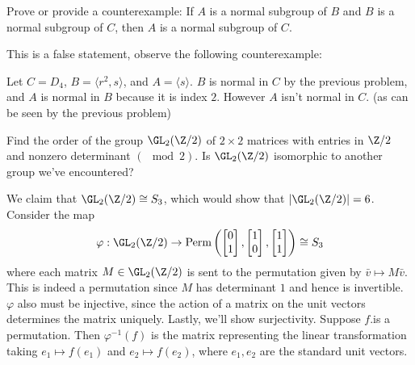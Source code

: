 \documentclass[11pt,letterpaper]{article}
\begin{document}
\pagebreak
\begin{problem}
  Prove or provide a counterexample: If $A$ is a normal subgroup of $B$ and $B$ is a normal subgroup of $C$, then $A$ is a normal subgroup of $C$. 
\end{problem}

This is a false statement, observe the following counterexample:
\begin{counterexample}
  Let $C=D_4$, $B=\big\langle r^2, s\big\rangle$, and $A=\big\langle s\big\rangle$. $B$ is normal in $C$ by the previous problem, and $A$ is normal in $B$ because it is index $2$. However $A$ isn't normal in $C$. (as can be seen by the previous problem)     
\end{counterexample}

\pagebreak
\begin{problem}
  Find the order of the group $\GL_2(\Z /2)$ of $2\times 2$ matrices with entries in $\Z /2$ and nonzero determinant $(\mod 2)$. Is $\GL_2(\Z /2)$ isomorphic to another group we've encountered?
\end{problem}

We claim that $\GL_2(\Z /2)\cong S_3$, which would show that $|\GL_2(\Z /2)|=6$. Consider the map
\[ \varphi : \GL_2(\Z /2) \to \textrm{Perm}\left(\begin{bmatrix}0\\1\end{bmatrix}, \begin{bmatrix}1\\0\end{bmatrix}, \begin{bmatrix}1\\1\end{bmatrix}\right)\cong S_3\]
where each matrix $M\in \GL_2(\Z /2)$ is sent to the permutation given by $\bar{v} \mapsto M\bar{v}$. This is indeed a permutation since $M$ has determinant $1$ and hence is invertible. $\varphi$ also must be injective, since the action of a matrix on the unit vectors determines the matrix uniquely. Lastly, we'll show surjectivity. Suppose $f$.is a permutation. Then $\varphi^{-1}(f)$ is the matrix representing the linear transformation taking $e_1 \mapsto f(e_1)$ and $e_2 \mapsto f(e_2)$, where $e_1,e_2$ are the standard unit vectors.
\end{document}
